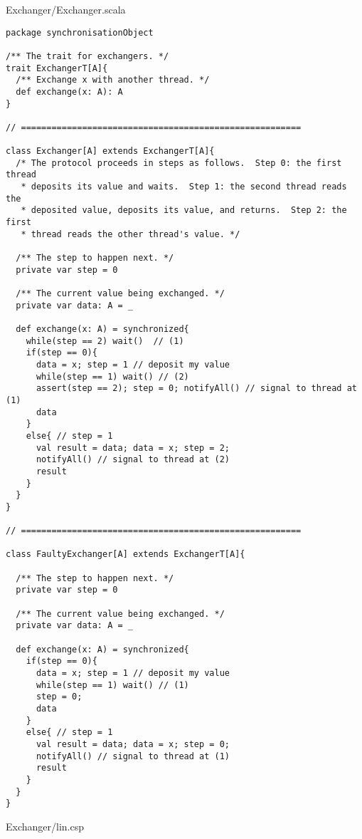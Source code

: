 Exchanger/Exchanger.scala
\begin{lstlisting}
package synchronisationObject

/** The trait for exchangers. */
trait ExchangerT[A]{
  /** Exchange x with another thread. */
  def exchange(x: A): A
}

// =======================================================

class Exchanger[A] extends ExchangerT[A]{
  /* The protocol proceeds in steps as follows.  Step 0: the first thread
   * deposits its value and waits.  Step 1: the second thread reads the
   * deposited value, deposits its value, and returns.  Step 2: the first
   * thread reads the other thread's value. */

  /** The step to happen next. */
  private var step = 0

  /** The current value being exchanged. */
  private var data: A = _

  def exchange(x: A) = synchronized{
    while(step == 2) wait()  // (1)
    if(step == 0){
      data = x; step = 1 // deposit my value
      while(step == 1) wait() // (2)
      assert(step == 2); step = 0; notifyAll() // signal to thread at (1)
      data
    }
    else{ // step = 1
      val result = data; data = x; step = 2; 
      notifyAll() // signal to thread at (2)
      result
    }
  }
}

// =======================================================

class FaultyExchanger[A] extends ExchangerT[A]{

  /** The step to happen next. */
  private var step = 0

  /** The current value being exchanged. */
  private var data: A = _

  def exchange(x: A) = synchronized{
    if(step == 0){
      data = x; step = 1 // deposit my value
      while(step == 1) wait() // (1)
      step = 0; 
      data
    }
    else{ // step = 1
      val result = data; data = x; step = 0; 
      notifyAll() // signal to thread at (1)
      result
    }
  }
}

\end{lstlisting}
Exchanger/lin.csp
